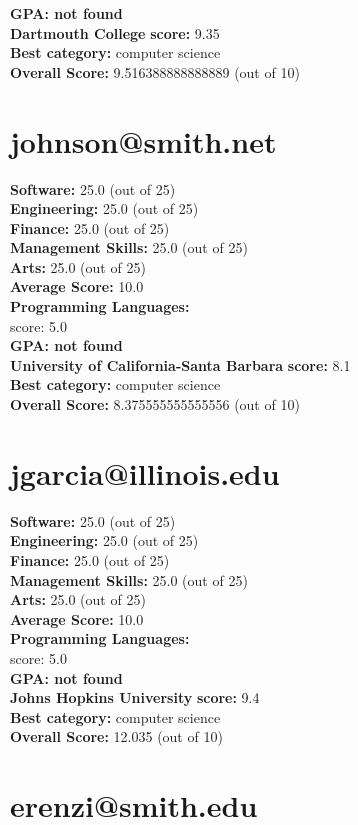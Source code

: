 \documentclass{article}
\begin{document}
\textbf{GPA: not found}\\
\textbf{Dartmouth College} \textbf{score:} 9.35\\
\textbf{Best category: } computer science\\
    \textbf{Overall Score: }9.516388888888889 (out of 10)\section{johnson@smith.net}
\textbf{Software:} 25.0 (out of 25)\\
    \textbf{Engineering: } 25.0 (out of 25)\\
    \textbf{Finance:} 25.0 (out of 25)\\
    \textbf{Management Skills:} 25.0 (out of 25)\\
    \textbf{Arts:} 25.0 (out of 25)\\
\textbf{Average Score: } 10.0\\
\textbf{Programming Languages:} \\
score: 5.0\\
\textbf{GPA: not found}\\
\textbf{University of California-Santa Barbara} \textbf{score:} 8.1\\
\textbf{Best category: } computer science\\
    \textbf{Overall Score: }8.375555555555556 (out of 10)\section{jgarcia@illinois.edu}
\textbf{Software:} 25.0 (out of 25)\\
    \textbf{Engineering: } 25.0 (out of 25)\\
    \textbf{Finance:} 25.0 (out of 25)\\
    \textbf{Management Skills:} 25.0 (out of 25)\\
    \textbf{Arts:} 25.0 (out of 25)\\
\textbf{Average Score: } 10.0\\
\textbf{Programming Languages:} \\
score: 5.0\\
\textbf{GPA: not found}\\
\textbf{Johns Hopkins University} \textbf{score:} 9.4\\
\textbf{Best category: } computer science\\
    \textbf{Overall Score: }12.035 (out of 10)\section{erenzi@smith.edu}
\end{document}
